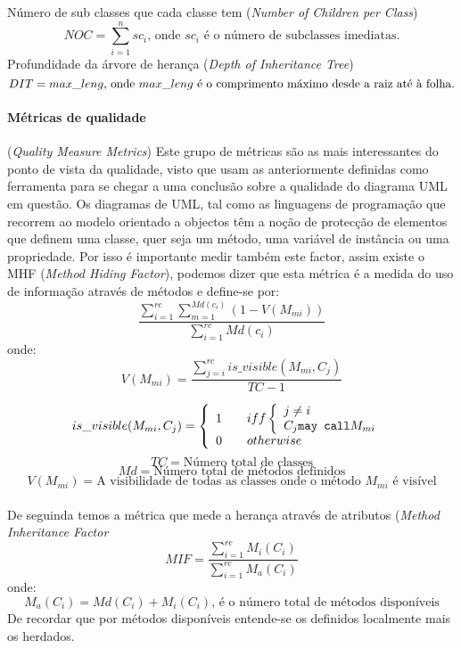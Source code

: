 Número de sub classes que cada classe tem (\textit{Number of Children per Class})
\begin{displaymath}
NOC = \sum_{i=1}^{n} sc_i  \textrm{, onde $sc_i$ é o número de subclasses imediatas.}
\end{displaymath}
Profundidade da árvore de herança (\textit{Depth of Inheritance Tree})
\begin{displaymath}
DIT = max\_leng  \textrm{, onde $ max\_leng $ é o comprimento máximo desde a raiz até à folha.}
\end{displaymath}

\paragraph{Métricas de qualidade} (\textit{Quality Measure Metrics}) Este grupo de métricas são as mais interessantes do ponto de vista da qualidade, visto que
usam as anteriormente definidas como ferramenta para se chegar a uma conclusão sobre a qualidade do diagrama UML em questão.
Os diagramas de UML, tal como as linguagens de programação que recorrem ao modelo orientado a objectos têm a noção de protecção de elementos que definem uma classe,
quer seja um método, uma variável de instância ou uma propriedade. Por isso é importante medir também este factor, assim existe o MHF (\textit{Method Hiding Factor}),
podemos dizer que esta métrica é a medida do uso de informação através de métodos e define-se por:
\begin{displaymath}
\frac{\sum_{i=1}^{rc} \sum_{m=1}^{Md(c_i)} (1-V(M_{mi}))} {\sum_{i=1}^{rc} Md(c_i)}
\end{displaymath}
onde:
$$V(M_{mi}) = \frac{\sum_{j=i}^{rc} is\_visible(M_{mi},C_j)}{TC-1} $$

\[ is\_visible(M_{mi},C_j) = \left\{ \begin{array}{l l}
	1 & \quad iff \left \{
		\begin{array}{l l}
			j \neq i \\
			C_j \texttt{may call} M_{mi}\\
		\end{array}
	\right.\\
0 & \quad otherwise\\
\end{array} \right. \]
$$TC = \textrm{Número total de classes}$$
$$Md = \textrm{Número total de métodos definidos}$$
$$V(M_{mi}) = \textrm{A visibilidade de todas as classes onde o método $M_{mi}$ é visível}$$
\\
De seguinda temos a métrica que mede a herança através de atributos (\textit{Method Inheritance Factor} $$MIF = \frac{\sum_{i=1}^{rc} M_i(C_i)}{\sum_{i=1}^{rc} M_a(C_i)} $$
onde:
$$ M_a(C_i) = Md(C_i) + M_i(C_i)\textrm{, é o número total de métodos disponíveis}$$
De recordar que por métodos disponíveis entende-se os definidos localmente mais os herdados.

